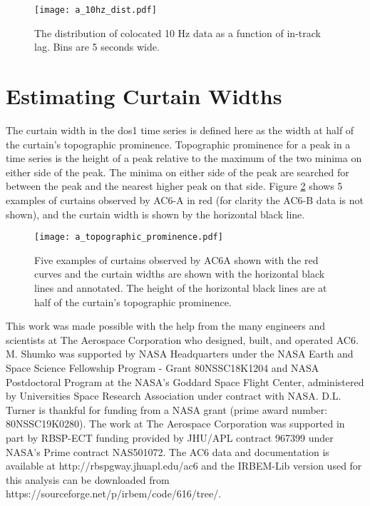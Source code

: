 \documentclass[draft]{agujournal2019}
\begin{document}
\begin{figure}
\texttt{[image: a\_10hz\_dist.pdf]}
\caption{The distribution of colocated 10 Hz data as a function of in-track lag. Bins are 5 seconds wide.}
\label{a_10Hz_dist}
\end{figure}

\section{Estimating Curtain Widths} \label{appendix_b}
The curtain width in the dos1 time series is defined here as the width at half of the curtain's topographic prominence. Topographic prominence for a peak in a time series is the height of a peak relative to the maximum of the two minima on either side of the peak. The minima on either side of the peak are searched for between the peak and the nearest higher peak on that side. Figure \ref{a_topographic_prominence} shows 5 examples of curtains observed by AC6-A in red (for clarity the AC6-B data is not shown), and the curtain width is shown by the horizontal black line.

\begin{figure}
\texttt{[image: a\_topographic\_prominence.pdf]}
\caption{Five examples of curtains observed by AC6A shown with the red curves and the curtain widths are shown with the horizontal black lines and annotated. The height of the horizontal black lines are at half of the curtain's topographic prominence.}
\label{a_topographic_prominence}
\end{figure}

\acknowledgments
This work was made possible with the help from the many engineers and scientists at The Aerospace Corporation who designed, built, and operated AC6. M. Shumko was supported by NASA Headquarters under the NASA Earth and Space Science Fellowship Program - Grant 80NSSC18K1204 and NASA Postdoctoral Program at the NASA's Goddard Space Flight Center, administered by Universities Space Research Association under contract with NASA. D.L. Turner is thankful for funding from a NASA grant (prime award number: 80NSSC19K0280). The work at The Aerospace Corporation was supported in part by RBSP-ECT funding provided by JHU/APL contract 967399 under NASA's Prime contract NAS501072. The AC6 data and documentation is available at http://rbspgway.jhuapl.edu/ac6 and the IRBEM-Lib version used for this analysis can be downloaded from \\ \noindent https://sourceforge.net/p/irbem/code/616/tree/. 


%
\end{document}
